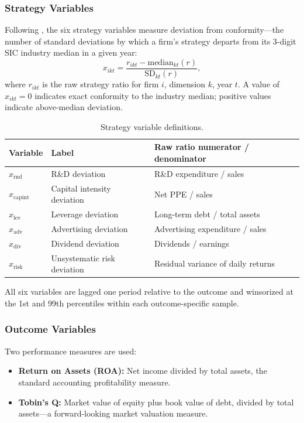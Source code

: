 \documentclass[12pt]{article}
\begin{document}
\subsubsection{Strategy Variables}

Following \citet{miller2013}, the six strategy variables measure deviation from conformity---the number of standard deviations by which a firm's strategy departs from its 3-digit SIC industry median in a given year:
\begin{equation}
    x_{ikt} = \frac{r_{ikt} - \text{median}_{kt}(r)}{\text{SD}_{kt}(r)},
    \label{eq:deviation}
\end{equation}
where $r_{ikt}$ is the raw strategy ratio for firm $i$, dimension $k$, year $t$. A value of $x_{ikt} = 0$ indicates exact conformity to the industry median; positive values indicate above-median deviation.

\begin{table}[htbp]
\centering
\caption{Strategy variable definitions.}
\label{tab:variables}
\begin{tabular}{lll}
\toprule
Variable & Label & Raw ratio numerator / denominator \\
\midrule
$x_{\text{rnd}}$    & R\&D deviation             & R\&D expenditure / sales \\
$x_{\text{capint}}$ & Capital intensity deviation & Net PPE / sales \\
$x_{\text{lev}}$    & Leverage deviation          & Long-term debt / total assets \\
$x_{\text{adv}}$    & Advertising deviation       & Advertising expenditure / sales \\
$x_{\text{div}}$    & Dividend deviation          & Dividends / earnings \\
$x_{\text{risk}}$   & Unsystematic risk deviation & Residual variance of daily returns \\
\bottomrule
\end{tabular}
\end{table}

All six variables are lagged one period relative to the outcome and winsorized at the 1st and 99th percentiles within each outcome-specific sample.

\subsubsection{Outcome Variables}

Two performance measures are used:
\begin{itemize}
    \item \textbf{Return on Assets (ROA):} Net income divided by total assets, the standard accounting profitability measure.
    \item \textbf{Tobin's Q:} Market value of equity plus book value of debt, divided by total assets---a forward-looking market valuation measure.
\end{itemize}
\end{document}
